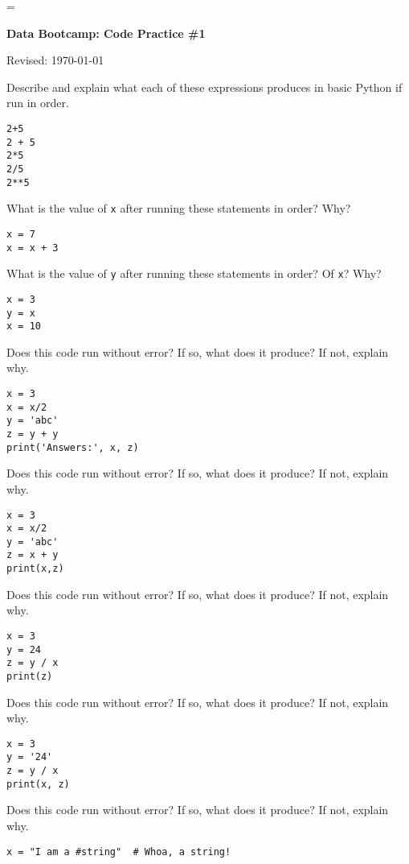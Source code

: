\documentclass[11pt]{exam}
\begin{document}
\parskip=\bigskipamount
\parindent=0.0in
\thispagestyle{empty}


\bigskip\bigskip
\centerline{\Large \bf Data Bootcamp:  Code Practice \#1}
\centerline{Revised: \today}


\begin{questions}
\item Describe and explain what each of these expressions produces in basic Python if run in order.
\begin{verbatim}
2+5
2 + 5
2*5 
2/5 
2**5
\end{verbatim}

\item What is the value of \texttt{x} after running these statements in order? Why?
\begin{verbatim}
x = 7
x = x + 3
\end{verbatim}

\item What is the value of \texttt{y} after running these statements in order? 
Of \texttt{x}?  Why?
\begin{verbatim}
x = 3
y = x
x = 10
\end{verbatim}

\item Does this code run without error?  If so, what does it produce?  If not, explain why.
\begin{verbatim}
x = 3
x = x/2
y = 'abc'
z = y + y 
print('Answers:', x, z)
\end{verbatim}

\item Does this code run without error?  If so, what does it produce?  If not, explain why.  
\begin{verbatim}
x = 3
x = x/2
y = 'abc'
z = x + y 
print(x,z)
\end{verbatim}

\item Does this code run without error?  If so, what does it produce?  If not, explain why.
\begin{verbatim}
x = 3
y = 24
z = y / x
print(z)
\end{verbatim}

\item Does this code run without error?  If so, what does it produce?  If not, explain why.
\begin{verbatim}
x = 3
y = '24'
z = y / x
print(x, z) 
\end{verbatim}

\item Does this code run without error?  If so, what does it produce?  If not, explain why.
\begin{verbatim}
x = "I am a #string"  # Whoa, a string!
\end{verbatim}


\end{questions}
\end{document}

